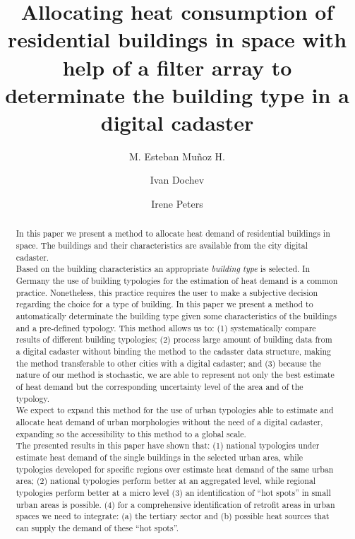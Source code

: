 \documentclass[authoryear,preprint,review,12pt]{elsarticle}
\begin{document}
\begin{frontmatter}

\title{Allocating heat consumption of residential buildings in space with help
    of a filter array to determinate the building type in a digital cadaster}

\author[HCU]{M. Esteban Mu\~{n}oz H.}
\author[HCU]{Ivan Dochev}
\author[HCU]{Irene Peters}

\address[HCU]{HafenCity Universit\"{a}t, Hamburg, DE}

\begin{abstract}
In this paper we present a method to allocate heat demand of residential
buildings in space. The buildings and their characteristics are available from
the city digital cadaster.\\

Based on the building characteristics an appropriate \textit{building type} is
selected. In Germany the use of building typologies for the estimation of heat
demand is a common practice. Nonetheless, this practice requires the user to
make a subjective decision regarding the choice for a type of building. In
this paper we present a method to automatically determinate the building type
given some characteristics of the buildings and a pre-defined typology. This method
allows us to: (1) systematically compare results of different building
typologies; (2) process large amount of building data from a digital cadaster
without binding the method to the cadaster data structure, making the method
transferable to other cities with a digital cadaster; and (3) because the
nature of our method is stochastic, we are able to represent not only the best
estimate of heat demand but the corresponding uncertainty level of the area and
of the typology.  \\

We expect to expand this method for the use of urban typologies able to
estimate and allocate heat demand of urban morphologies without the need of a
digital cadaster, expanding so the accessibility to this method to a global
scale.\\

The presented results in this paper have shown that: (1) national typologies
under estimate heat demand of the single buildings in the selected urban area,
while typologies developed for specific regions over estimate heat demand of
the same urban area; (2) national typologies perform better at an aggregated
level, while regional typologies perform better at a micro level (3) an
identification of ``hot spots'' in small urban areas is possible.  (4) for a
comprehensive identification of retrofit areas in urban spaces we need to
integrate: (a) the tertiary sector and (b) possible heat sources that can
supply the demand of these ``hot spots''.
\end{abstract}


\end{frontmatter}
\end{document}

